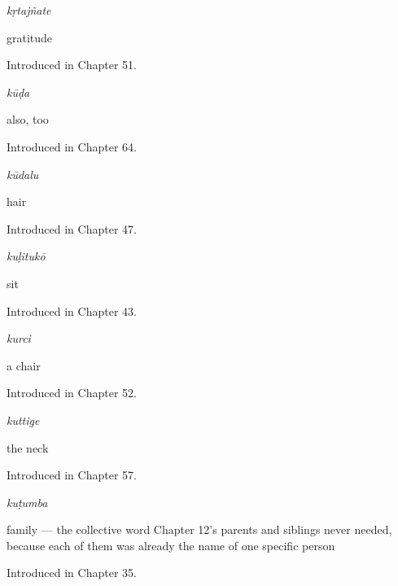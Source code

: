 \noindent\begin{minipage}[t]{\linewidth}
\raggedright
\textbf{}\enspace\emph{kṛtajñate}\par
\small gratitude\par
\footnotesize Introduced in Chapter 51.
\end{minipage}\par\medskip

\noindent\begin{minipage}[t]{\linewidth}
\raggedright
\textbf{}\enspace\emph{kūḍa}\par
\small also, too\par
\footnotesize Introduced in Chapter 64.
\end{minipage}\par\medskip

\noindent\begin{minipage}[t]{\linewidth}
\raggedright
\textbf{}\enspace\emph{kūdalu}\par
\small hair\par
\footnotesize Introduced in Chapter 47.
\end{minipage}\par\medskip

\noindent\begin{minipage}[t]{\linewidth}
\raggedright
\textbf{}\enspace\emph{kuḷitukō}\par
\small sit\par
\footnotesize Introduced in Chapter 43.
\end{minipage}\par\medskip

\noindent\begin{minipage}[t]{\linewidth}
\raggedright
\textbf{}\enspace\emph{kurci}\par
\small a chair\par
\footnotesize Introduced in Chapter 52.
\end{minipage}\par\medskip

\noindent\begin{minipage}[t]{\linewidth}
\raggedright
\textbf{}\enspace\emph{kuttige}\par
\small the neck\par
\footnotesize Introduced in Chapter 57.
\end{minipage}\par\medskip

\noindent\begin{minipage}[t]{\linewidth}
\raggedright
\textbf{}\enspace\emph{kuṭumba}\par
\small family — the collective word Chapter 12's parents and siblings never needed, because each of them was already the name of one specific person\par
\footnotesize Introduced in Chapter 35.
\end{minipage}\par\medskip


